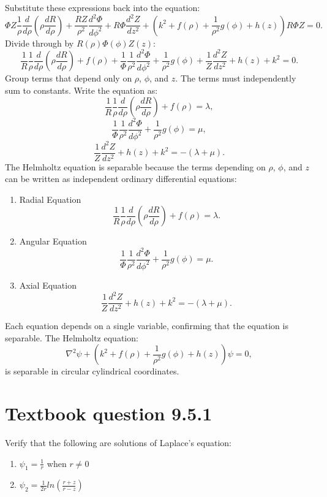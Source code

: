 \documentclass[12pt]{article}
\begin{document}
        Substitute these expressions back into the equation:
        \[
        \Phi Z \frac{1}{\rho} \frac{d}{d \rho} \left( \rho \frac{dR}{d\rho} \right) + \frac{RZ}{\rho^2} \frac{d^2 \Phi}{d \phi^2} + R\Phi \frac{d^2 Z}{dz^2} + \left(k^2 + f(\rho) + \frac{1}{\rho^2} g(\phi) + h(z)\right) R\Phi Z = 0.
        \]
        Divide through by \(R(\rho)\Phi(\phi)Z(z)\):
        \[
        \frac{1}{R}\frac{1}{\rho} \frac{d}{d \rho} \left( \rho \frac{dR}{d\rho} \right) + f(\rho) + \frac{1}{\Phi} \frac{1}{\rho^2} \frac{d^2 \Phi}{d \phi^2} + \frac{1}{\rho^2} g(\phi) + \frac{1}{Z} \frac{d^2 Z}{dz^2} + h(z) + k^2 = 0.
        \]
        Group terms that depend only on \(\rho\), \(\phi\), and \(z\). The terms must independently sum to constants. Write the equation as:
        \[
        \frac{1}{R}\frac{1}{\rho} \frac{d}{d \rho} \left( \rho \frac{dR}{d\rho} \right) + f(\rho) = \lambda,
        \]
        \[
        \frac{1}{\Phi} \frac{1}{\rho^2} \frac{d^2 \Phi}{d \phi^2} + \frac{1}{\rho^2} g(\phi) = \mu,
        \]
        \[
        \frac{1}{Z} \frac{d^2 Z}{dz^2} + h(z) + k^2 = -(\lambda + \mu).
        \]
        The Helmholtz equation is separable because the terms depending on \(\rho\), \(\phi\), and \(z\) can be written as independent ordinary differential equations:
        \begin{enumerate}
            \item Radial Equation
            \[
            \frac{1}{R}\frac{1}{\rho} \frac{d}{d \rho} \left( \rho \frac{dR}{d\rho} \right) + f(\rho) = \lambda.
            \]
        
            \item Angular Equation
            \[
            \frac{1}{\Phi} \frac{1}{\rho^2} \frac{d^2 \Phi}{d \phi^2} + \frac{1}{\rho^2} g(\phi) = \mu.
            \]
        
            \item Axial Equation
            \[
            \frac{1}{Z} \frac{d^2 Z}{dz^2} + h(z) + k^2 = -(\lambda + \mu).
            \]
        \end{enumerate}
        Each equation depends on a single variable, confirming that the equation is separable.
        The Helmholtz equation:
        \[
        \nabla^2 \psi + \left(k^2 + f(\rho) + \frac{1}{\rho^2} g(\phi) + h(z)\right)\psi = 0,
        \]
        is separable in circular cylindrical coordinates.

\section*{Textbook question 9.5.1}
    Verify that the following are solutions of Laplace's equation:
    \begin{enumerate}
        \item [(a)] $\psi_1 = \frac{1}{r}$ when $r \neq 0$
        \item [(b)] $\psi_2 = \frac{1}{2r} ln\left( \frac{r + z}{r - z} \right)$
    \end{enumerate}
\end{document}
